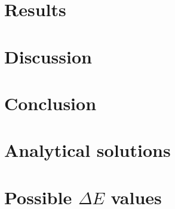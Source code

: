 \documentclass[english,notitlepage,reprint,nofootinbib]{revtex4-1}  %
\begin{document}
\section{Results}\label{sec:results}



\section{Discussion}\label{sec:discussion}
%


\section{Conclusion}\label{sec:conclusion}



\onecolumngrid

%


\newpage
\appendix
\section{Analytical solutions}\label{appendix:A}

\section{Possible $\Delta E$ values}\label{appendix:B}
\end{document}
